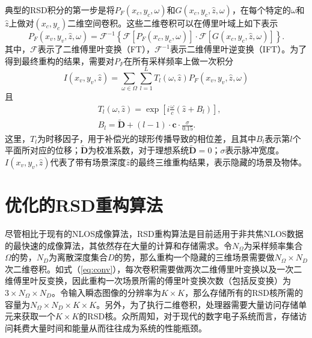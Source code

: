 \documentclass[master]{shtthesis}             %
\begin{document}
典型的RSD积分的第一步是将$P_F(x_c,y_c,\omega)$和$G(x_c,y_c,\hat{z},\omega)$，在每个特定的$\omega$和$\hat{z}$上做对$(x_c,y_c)$二维空间卷积。这些二维卷积可以在傅里叶域上如下表示
\begin{equation}\label{eq:conv}
  P_F(x_v, y_v, \hat{z}, \omega) = \mathcal{F}^{-1}\left\{\mathcal{F}\left[P_F(x_c, y_c, \omega)\right]\cdot \mathcal{F}\left[G(x_c, y_c, \hat{z}, \omega)\right]\right\}.
\end{equation}
其中，$\mathcal{F}$表示了二维傅里叶变换（FT），$\mathcal{F}^{-1}$表示二维傅里叶逆变换（IFT）。为了得到最终重构的结果，需要对$P_F$在所有采样频率上做一次积分
\begin{equation}
  I(x_v, y_v, \hat{z}) = \sum_{\omega \in  {\Omega}}\sum_{l=1}^{L} T_l(\omega, \hat{z}) P_F(x_v, y_v, \hat{z}, \omega)
\end{equation}
且
\begin{align}
    &T_l(\omega, \hat{z}) = \exp\left[i\frac{\omega}{c}(\hat{z}+B_l)\right],\label{eq:ts} \\
    &B_l =\tilde{\mathbf{D}} + (l-1)\cdot \mathbf{c}\cdot \frac{\sigma}{0.15}.
\end{align}
这里，$T_l$为时移因子，用于补偿光的球形传播导致的相位差，且其中$B_l$表示第$l$个平面所对应的位移；$\tilde{\mathbf{D}}$为校准系数，对于理想系统$\tilde{\mathbf{D}}=0$；$\sigma$表示脉冲宽度。$I(x_v,y_v,\hat{z})$代表了带有场景深度$\hat{z}$的最终三维重构结果，表示隐藏的场景及物体。

\section{优化的RSD重构算法}\label{sec:opt_rsd_algo}

尽管相比于现有的NLOS成像算法，RSD重构算法是目前适用于非共焦NLOS数据的最快速的成像算法，其依然存在大量的计算和存储需求。令$N_\Omega$为采样频率集合$\Omega$的势，$N_D$为离散深度集合$D$的势，那么重构一个隐藏的三维场景需要做$N_\Omega\times N_D$次二维卷积。如式（\ref{eq:conv}），每次卷积需要做两次二维傅里叶变换以及一次二维傅里叶反变换，因此重构一次场景所需的傅里叶变换次数（包括反变换）为$3\times N_\Omega \times N_D$。令输入瞬态图像的分辨率为$K\times K$，那么存储所有的RSD核所需的容量为$N_\Omega\times N_D\times K\times K$。另外，为了执行二维卷积，处理器需要大量访问存储单元来获取一个$K\times K$的RSD核。众所周知，对于现代的数字电子系统而言，存储访问耗费大量时间和能量从而往往成为系统的性能瓶颈\citep{hennessy2011computer}。
\end{document}

